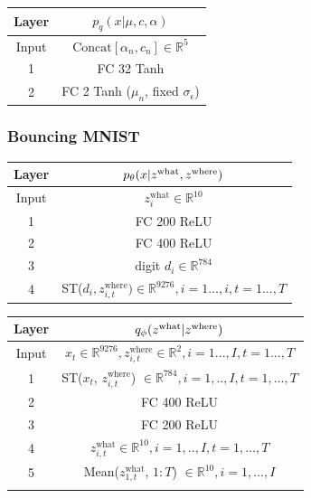 \documentclass{article}
\theoremstyle{definition}
\begin{document}
\begin{table}[h!]
    \centering
    \begin{tabular}{c|c}
    \toprule
    \textbf{Layer}
    &
    $p_q(x | \mu, c, \alpha)$ \\
    \midrule
    Input
    &
    $\mathrm{Concat}[\alpha_n, c_n]\in\mathbb{R}^5$ 
    \\
    \hline
    1
    &
    FC 32 Tanh \\
    \hline
    2
    &
    FC 2 Tanh ($\mu_n$, fixed $\sigma_\epsilon$)\\
    \bottomrule
    \end{tabular}
    \label{arch-dgmm-decoder}
\end{table}

\newpage
\subsubsection*{Bouncing MNIST}
\begin{table}[H]
\centering
\label{arch-bmnist-decoder}
\begin{tabular}{c|c}
    \toprule
    \textbf{Layer} & $p_\theta(x | z^{\mathrm{what}}, z^{\mathrm{where}})$ \\
    \midrule
    Input & $z^{\mathrm{what}}_i \in\mathbb{R}^{10}$
    \\
    \hline
    1 &
    FC 200 ReLU \\
    \hline
    2 &
    FC 400 ReLU \\
    \hline
    3 & digit $d_i\in\mathbb{R}^{784}$\\
    \hline
    4 & ST($d_{i}, z^{\mathrm{where}}_{i, t}) \in\mathbb{R}^{9276}, i=1...,i, t=1...,T$ \\
    \bottomrule
\end{tabular}
\end{table}

\begin{table}[h!]
\centering
\begin{tabular}{c|c}
    \toprule
    \textbf{Layer} & $q_\phi(z^{\mathrm{what}} | z^{\mathrm{where}})$ \\
    \midrule
    Input & $x_t\in\mathbb{R}^{9276}, z^{\mathrm{where}}_{i, t}\in\mathbb{R}^{2}, i=1...,I, t=1...,T$
    \\
    \hline
    1 & 
    ST($x_t$, $z^{\mathrm{where}} _{i, t}$) $\in\mathbb{R}^{784}, i=1,..,I, t=1,...,T$  \\
    \hline
    2 &
    FC 400 ReLU \\
    \hline
    3 &
    FC 200 ReLU \\
    \hline
    4 & $z^{\mathrm{what}}_{i, t} \in\mathbb{R}^{10}, i=1,..,I, t=1,...,T$  \\
    \hline
    5 &
    Mean($z^{\mathrm{what}}_{1, t}$, $1:T$) $\in\mathbb{R}^{10}, i=1,...,I$\\
    \bottomrule
    \label{arch-bmnist-enc-what}
\end{tabular}
\end{table}
\end{document}
